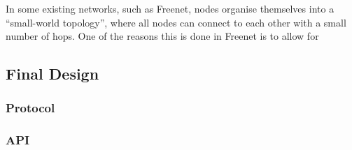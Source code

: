 			In some existing networks, such as Freenet, nodes organise themselves into a ``small-world topology'', where all nodes can connect to each other with a small number of hops. One of the reasons this is done in Freenet is to allow for 

			
	\subsection{Final Design}
		\subsubsection{Protocol}
			
		\subsubsection{API}